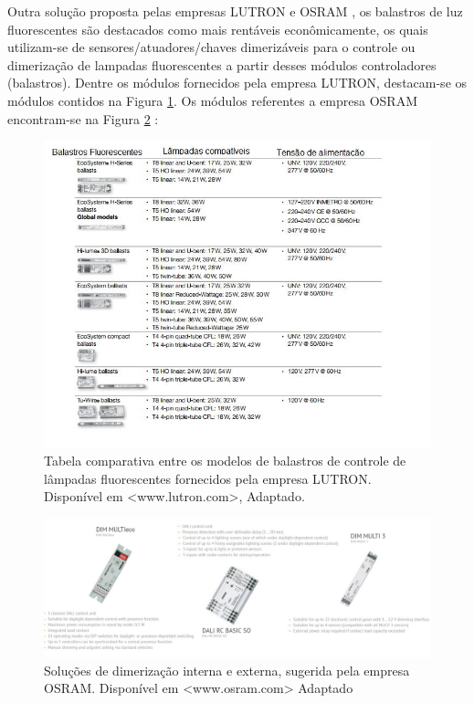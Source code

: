Outra solução proposta pelas empresas LUTRON \cite{2} e OSRAM \cite{3}, os balastros de luz fluorescentes são destacados como mais rentáveis econômicamente, os quais utilizam-se de sensores/atuadores/chaves dimerizáveis para o controle ou dimerização de lampadas fluorescentes a partir desses módulos controladores (balastros). Dentre os módulos fornecidos pela empresa LUTRON, destacam-se os módulos contidos na Figura \ref{fig:tabelabalastros}.  Os módulos referentes a empresa OSRAM encontram-se na Figura \ref{fig:solucaodimerizacao} :
 
\begin{figure}[!h]
	\centering
	\includegraphics[width=1.0\textwidth]{figuras/tabelaBalastros.jpeg}
	\caption{Tabela comparativa entre os modelos de balastros de controle de lâmpadas fluorescentes fornecidos pela empresa LUTRON. Disponível em <www.lutron.com>, Adaptado.}
	\label{fig:tabelabalastros}
\end{figure}

\begin{figure}[!h]
	\centering
	\includegraphics[width=1.0\textwidth]{figuras/solucaoDimerizacao.jpeg}
	\caption{Soluções de dimerização interna e externa, sugerida pela empresa OSRAM. Disponível em <www.osram.com> Adaptado}
	\label{fig:solucaodimerizacao}
\end{figure}

